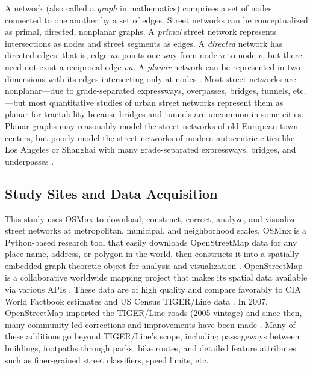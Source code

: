\documentclass[11pt]{article}
\begin{document}
\begin{multicols}{2}
A network (also called a \emph{graph} in mathematics) comprises a set of nodes connected to one another by a set of edges. Street networks can be conceptualized as primal, directed, nonplanar graphs. A \emph{primal} street network represents intersections as nodes and street segments as edges. A \emph{directed} network has directed edges: that is, edge $uv$ points one-way from node $u$ to node $v$, but there need not exist a reciprocal edge $vu$. A \emph{planar} network can be represented in two dimensions with its edges intersecting only at nodes \citep{viana_simplicity_2013, fischer_spatial_2014}. Most street networks are nonplanar---due to grade-separated expressways, overpasses, bridges, tunnels, etc.---but most quantitative studies of urban street networks represent them as planar \citep[e.g.,][]{buhl_topological_2006, cardillo_structural_2006, barthelemy_modeling_2008, masucci_random_2009, strano_urban_2013} for tractability because bridges and tunnels are uncommon in some cities. Planar graphs may reasonably model the street networks of old European town centers, but poorly model the street networks of modern autocentric cities like Los Angeles or Shanghai with many grade-separated expressways, bridges, and underpasses \citep{boeing_planarity_2018}.

\subsection{Study Sites and Data Acquisition}

This study uses OSMnx to download, construct, correct, analyze, and visualize street networks at metropolitan, municipal, and neighborhood scales. OSMnx is a Python-based research tool that easily downloads OpenStreetMap data for any place name, address, or polygon in the world, then constructs it into a spatially-embedded graph-theoretic object for analysis and visualization \citep{boeing_osmnx:_2017,boeing_methods_2017}. OpenStreetMap is a collaborative worldwide mapping project that makes its spatial data available via various APIs \citep{corcoran_analysing_2013, jokar_arsanjani_openstreetmap_2015}. These data are of high quality and compare favorably to CIA World Factbook estimates and US Census TIGER/Line data \citep{haklay_how_2010, over_generating_2010, zielstra_comparative_2011, maron_how_2015, wu_improving_2005, frizzelle_importance_2009}. In 2007, OpenStreetMap imported the TIGER/Line roads (2005 vintage) and since then, many community-led corrections and improvements have been made \citep{willis_openstreetmap_2008}. Many of these additions go beyond TIGER/Line's scope, including passageways between buildings, footpaths through parks, bike routes, and detailed feature attributes such as finer-grained street classifiers, speed limits, etc.


\end{multicols}
\end{document}
